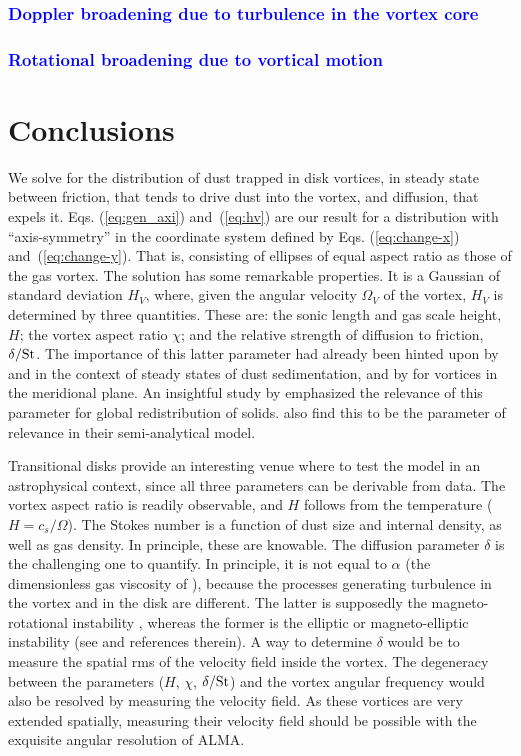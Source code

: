 \documentclass[apj]{emulateapj}
\def\blue#1{\textcolor{blue}{#1}}
\newcommand{\Eqs}[2]{Eqs. (\ref{#1}) and~(\ref{#2})}
\newcommand{\eqs}[2]{\Eqs{#1}{#2}}
\newcommand{\St}{{\rm St}}
\begin{document}
\subsubsection{\blue{Doppler broadening due to turbulence in the vortex core}}

\subsubsection{\blue{Rotational broadening due to vortical motion}}

\section{Conclusions}

We solve for the distribution of dust trapped in
disk vortices, in steady state between friction, that 
tends to drive dust into the vortex, and diffusion, that expels
it. \eqs{eq:gen_axi}{eq:hv} are our result for a distribution with
``axis-symmetry''  in the coordinate system defined by
\eqs{eq:change-x}{eq:change-y}. That is, consisting of ellipses of
equal aspect ratio as those of the gas vortex. The solution has some remarkable
properties. It is a Gaussian of standard deviation $H_V$, where, given
the angular velocity $\varOmega_V$ of the vortex, $H_V$
is determined by three quantities. These are: 
the sonic length and gas scale height, $H$; the vortex aspect ratio
$\chi$; and the relative strength of diffusion to friction,
$\delta/\St$. The importance of this latter parameter had already been 
hinted upon by \citet{Cuzzi93} and \citet{Dubrulle95} 
in the context of steady states of dust sedimentation, and by
\citet{Klahr-Henning97} for vortices in the meridional plane. An insightful study by 
\citet{Jacquet12} emphasized the relevance of this parameter for 
global redistribution of solids. \citet{Birnstiel13} also find this to be 
the parameter of relevance in their semi-analytical model.

Transitional disks provide an interesting venue where to test the
model in an astrophysical context, since all three parameters can be
derivable from data. The vortex aspect ratio is readily observable,
and $H$ follows from the temperature ($H=c_s/\varOmega$). The Stokes number is a function of
dust size and internal density, as well as gas density. In principle,
these are knowable. The diffusion parameter $\delta$ is the
challenging one to quantify. In principle, it is not equal to
$\alpha$ (the dimensionless gas viscosity of
\citealt{Shakura-Sunyaev73}), because the processes generating turbulence in the
vortex and in the disk are different. The latter is supposedly the
magneto-rotational instability \citep[MRI,][]{Balbus-Hawley91}, whereas the former is the elliptic or
magneto-elliptic instability (see \citealt{Lyra13} and references
therein). A way to determine $\delta$ would be to measure the spatial rms of
the velocity field inside the vortex. The degeneracy between the
parameters ($H$, $\chi$, $\delta/\St$) and the vortex angular frequency
would also be resolved by measuring the velocity field. As these
vortices are very extended spatially, measuring their velocity field
should be possible with the exquisite angular resolution of ALMA.
\end{document}
